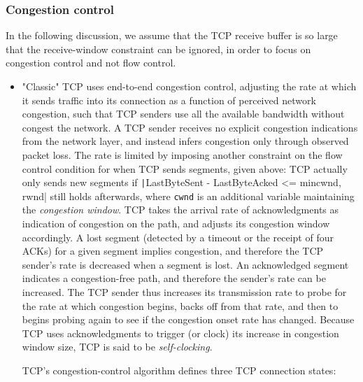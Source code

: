 \documentclass[table, xcdraw]{article}%
\begin{document}
\subsubsection{Congestion control}

In the following discussion, we assume that the TCP receive buffer is so large that the receive-window constraint can be ignored, in order to focus on congestion control and not flow control.

\begin{itemize}
    \item "Classic" TCP uses end-to-end congestion control, adjusting the rate at which it sends traffic into its connection as a function of perceived network congestion, such that TCP senders use all the available bandwidth without congest the network. A TCP sender receives no explicit congestion indications from the network layer, and instead infers congestion only through observed packet loss. The rate is limited by imposing another constraint on the flow control condition for when TCP sends segments, given above: TCP actually only sends new segments if \texttt|LastByteSent - LastByteAcked <= min{cwnd, rwnd}| still holds afterwards, where \texttt{cwnd} is an additional variable maintaining the \emph{congestion window}. TCP takes the arrival rate of acknowledgments as indication of congestion on the path, and adjusts its congestion window accordingly. A lost segment (detected by a timeout or the receipt of four ACKs) for a given segment implies congestion, and therefore the TCP sender’s rate is decreased when a segment is lost. An acknowledged segment indicates a congestion-free path, and therefore the sender’s rate can be increased. The TCP sender thus increases its transmission rate to probe for the rate at which congestion begins, backs off from that rate, and then to begins probing again to see if the congestion onset rate has changed. Because TCP uses acknowledgments to trigger (or clock) its increase in congestion window size, TCP is said to be \emph{self-clocking}.

    TCP's congestion-control algorithm defines three TCP connection states:
    

\end{itemize}
\end{document}

